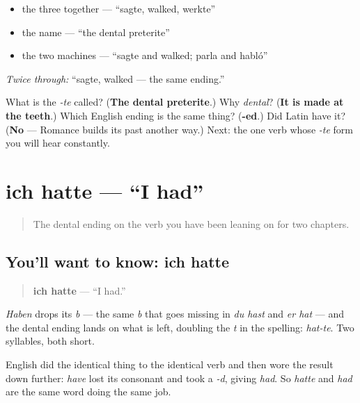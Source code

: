 \begin{itemize}
\raggedright
  \item the three together — \textquotedblleft{}sagte, walked, werkte\textquotedblright{}
  \item the name — \textquotedblleft{}the dental preterite\textquotedblright{}
  \item the two machines — \textquotedblleft{}sagte and walked; parla and habló\textquotedblright{}
\end{itemize}

\emph{Twice through:} \textquotedblleft{}sagte, walked — the same ending.\textquotedblright{}

\begin{tcolorbox}[breakable,colback=teal!4,colframe=teal!35!black,title={Before you move on}]
What is the \emph{-te} called? (\textbf{The dental preterite}.) Why \emph{dental}? (\textbf{It is made at the teeth}.) Which English ending is the same thing? (\textbf{-ed}.) Did Latin have it? (\textbf{No} — Romance builds its past another way.) Next: the one verb whose \emph{-te} form you will hear constantly.
\end{tcolorbox}
\section[ich hatte]{ich hatte — \textquotedblleft{}I had\textquotedblright{}}

\label{lesson:GE-C15-hatte}



\begin{quote}
The dental ending on the verb you have been leaning on for two chapters.
\end{quote}

\subsection*{You'll want to know: ich hatte}
\begin{quote}
\textbf{ich hatte} — \textquotedblleft{}I had.\textquotedblright{}
\end{quote}

\emph{Haben} drops its \emph{b} — the same \emph{b} that goes missing in \emph{du hast} and \emph{er hat} — and the dental ending lands on what is left, doubling the \emph{t} in the spelling: \emph{hat-te}. Two syllables, both short.

English did the identical thing to the identical verb and then wore the result down further: \emph{have} lost its consonant and took a \emph{-d}, giving \emph{had}. So \emph{hatte} and \emph{had} are the same word doing the same job.

